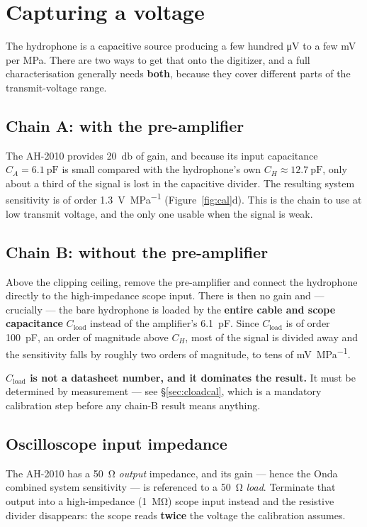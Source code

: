 \documentclass[11pt,a4paper]{article}
\newcommand{\caveat}[1]{\textcolor{orange!75!black}{\textbf{#1}}}
\begin{document}
\section{Capturing a voltage}\label{sec:voltage}
The hydrophone is a capacitive source producing a few hundred \si{\micro\volt} to a few
\si{\milli\volt} per \si{\mega\pascal}. There are two ways to get that onto the digitizer, and a full
characterisation generally needs \textbf{both}, because they cover different parts of the
transmit-voltage range.

\subsection{Chain A: with the pre-amplifier}
The AH-2010 provides \SI{20}{\decibel} of gain, and because its input capacitance
$C_A=\SI{6.1}{\pico\farad}$ is small compared with the hydrophone's own $C_H\approx\SI{12.7}{\pico
\farad}$, only about a third of the signal is lost in the capacitive divider. The resulting system
sensitivity is of order \SI{1.3}{\volt\per\mega\pascal} (Figure~\ref{fig:cal}d). This is the chain to
use at low transmit voltage, and the only one usable when the signal is weak.

\subsection{Chain B: without the pre-amplifier}\label{sec:nopreamp}
Above the clipping ceiling, remove the pre-amplifier and connect the hydrophone directly to the
high-impedance scope input. There is then no gain and --- crucially --- the bare hydrophone is loaded
by the \textbf{entire cable and scope capacitance} $C_\mathrm{load}$ instead of the amplifier's
\SI{6.1}{\pico\farad}. Since $C_\mathrm{load}$ is of order \SI{100}{\pico\farad}, an order of
magnitude above $C_H$, most of the signal is divided away and the sensitivity falls by roughly two
orders of magnitude, to tens of \si{\milli\volt\per\mega\pascal}.

\caveat{$C_\mathrm{load}$ is not a datasheet number, and it dominates the result.} It must be
determined by measurement --- see \S\ref{sec:cloadcal}, which is a mandatory calibration step before
any chain-B result means anything.

\subsection{Oscilloscope input impedance}\label{sec:impedance}
The AH-2010 has a \SI{50}{\ohm} \emph{output} impedance, and its gain --- hence the Onda combined
system sensitivity --- is referenced to a \SI{50}{\ohm} \emph{load}. Terminate that output into a
high-impedance (\SI{1}{\mega\ohm}) scope input instead and the resistive divider disappears: the
scope reads \textbf{twice} the voltage the calibration assumes.
\end{document}
